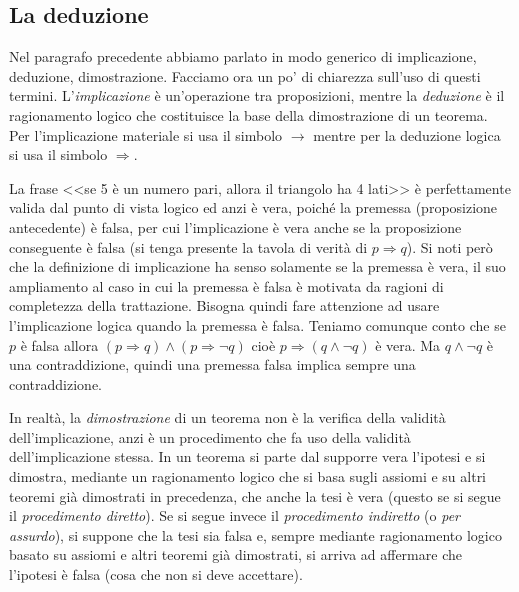 \subsection{La deduzione}

Nel paragrafo precedente abbiamo parlato in modo generico di 
implicazione, deduzione, dimostrazione. Facciamo ora un po' di 
chiarezza sull'uso di questi termini. L'\emph{implicazione} è 
un'operazione tra proposizioni, mentre la \emph{deduzione} è il 
ragionamento logico che costituisce la base della dimostrazione di un 
teorema. Per l'implicazione materiale si usa il simbolo $\rightarrow$ 
mentre per la deduzione logica si usa il simbolo $\Rightarrow$.

La frase <<se 5 è un numero pari, allora il triangolo ha 4 lati>> è 
perfettamente valida dal punto di vista logico ed anzi è vera, poiché 
la premessa (proposizione antecedente) è falsa, per cui 
l'implicazione è vera anche se la proposizione conseguente è falsa (si 
tenga presente la tavola di verità di $p\Rightarrow q$).
Si noti però che la definizione di implicazione ha senso solamente se 
la premessa è vera, il suo ampliamento al caso in cui la premessa è 
falsa è motivata da ragioni di completezza della trattazione. Bisogna 
quindi fare attenzione ad usare l'implicazione logica quando la 
premessa è falsa. Teniamo comunque conto che se $p$ è falsa allora 
$(p\Rightarrow q)\wedge(p\Rightarrow \neg q)$ cioè $p\Rightarrow 
(q\wedge \neg q)$ è vera. Ma  $q\wedge \neg q$ è una contraddizione, 
quindi una premessa falsa implica sempre una contraddizione.

In realtà, la \emph{dimostrazione} di un teorema non è la verifica 
della validità dell'implicazione, anzi è un procedimento che fa uso 
della validità dell'implicazione stessa. In un teorema si parte dal 
supporre vera l'ipotesi e si dimostra, mediante un ragionamento 
logico che si basa sugli assiomi e su altri teoremi già dimostrati in 
precedenza, che anche la tesi è vera (questo se si segue il 
\emph{procedimento diretto}). Se si segue invece il 
\emph{procedimento indiretto} (o \emph{per assurdo}), si suppone che 
la tesi sia falsa e, sempre mediante ragionamento logico basato su 
assiomi e altri teoremi già dimostrati, si arriva ad affermare che 
l'ipotesi è falsa (cosa che non si deve accettare).


